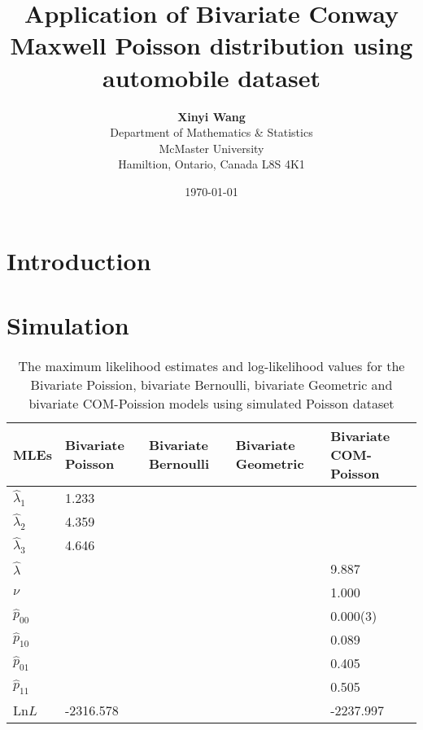 \documentclass[12pt]{article}
\begin{document}
		\title{\bf Application of Bivariate Conway Maxwell Poisson distribution using automobile dataset }
\author{{\bf Xinyi Wang}\\Department of Mathematics \& Statistics \\McMaster University\\Hamiltion, Ontario, Canada L8S 4K1\\}
\date{\today}
\maketitle
\vspace{5cm}



\newpage
\section{Introduction}



\section{Simulation}
\begin{table}[H]
	\begin{center}
		\caption[\textbf{1}]
		{The maximum likelihood estimates and log-likelihood values for the Bivariate Poission, bivariate Bernoulli, bivariate Geometric and bivariate COM-Poission models using simulated Poisson dataset }
		\small
		\vspace{-1em}
		\begin{tabular}{lllll}
			\hline	\hline
			\textbf{MLEs} &\textbf{Bivariate Poisson}  & \textbf{Bivariate Bernoulli}&\textbf{Bivariate Geometric}& \textbf{Bivariate COM-Poisson}   \\
			\hline
			$\hat{\lambda}_1$&	1.233  & && \\
			$\hat{\lambda}_2$ & 4.359 & && \\
			$\hat{\lambda}_3$  & 4.646   & &&	 \\
			$\hat{\lambda}$  &  &   &&9.887\\
			$\nu$ &  &  &&1.000\\
			$\hat{p}_{00}$  &  & &&0.000(3)\\
			$\hat{p}_{10}$ &&&&0.089\\
			$\hat{p}_{01}$ &&&&0.405\\
			$\hat{p}_{11}$ &&&&0.505\\
			Ln$L$ &-2316.578&&&-2237.997\\
			\hline
		\end{tabular}
	\end{center}
\end{table}
\end{document}
